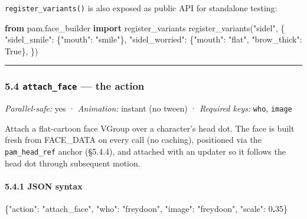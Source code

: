 \documentclass[
  12pt,
  letterpaper,
]{book}
\newenvironment{Shaded}{}{}
\newcommand{\DataTypeTok}[1]{\textcolor[rgb]{0.56,0.13,0.00}{#1}}
\newcommand{\DecValTok}[1]{\textcolor[rgb]{0.25,0.63,0.44}{#1}}
\newcommand{\ErrorTok}[1]{\textcolor[rgb]{1.00,0.00,0.00}{\textbf{#1}}}
\newcommand{\FunctionTok}[1]{\textcolor[rgb]{0.02,0.16,0.49}{#1}}
\newcommand{\ImportTok}[1]{\textcolor[rgb]{0.00,0.50,0.00}{\textbf{#1}}}
\newcommand{\NormalTok}[1]{#1}
\newcommand{\StringTok}[1]{\textcolor[rgb]{0.25,0.44,0.63}{#1}}
\newcommand{\VariableTok}[1]{\textcolor[rgb]{0.10,0.09,0.49}{#1}}
\begin{document}
\texttt{register\_variants()} is also exposed as public API for
standalone testing:

\begin{Shaded}
\begin{Highlighting}[]
\ImportTok{from}\NormalTok{ pam.face\_builder }\ImportTok{import}\NormalTok{ register\_variants}
\NormalTok{register\_variants(}\StringTok{"sidel"}\NormalTok{, \{}
    \StringTok{"sidel\_smile"}\NormalTok{:   \{}\StringTok{"mouth"}\NormalTok{: }\StringTok{"smile"}\NormalTok{\},}
    \StringTok{"sidel\_worried"}\NormalTok{: \{}\StringTok{"mouth"}\NormalTok{: }\StringTok{"flat"}\NormalTok{, }\StringTok{"brow\_thick"}\NormalTok{: }\VariableTok{True}\NormalTok{\},}
\NormalTok{\})}
\end{Highlighting}
\end{Shaded}

\begin{center}\rule{0.5\linewidth}{0.5pt}\end{center}

\subsubsection{\texorpdfstring{5.4 \texttt{attach\_face} --- the
action}{5.4 attach\_face --- the action}}\label{attach_face-the-action}

\emph{Parallel-safe:} yes · \emph{Animation:} instant (no tween) ·
\emph{Required keys:} \texttt{who}, \texttt{image}

Attach a flat-cartoon face VGroup over a character's head dot. The face
is built fresh from FACE\_DATA on every call (no caching), positioned
via the \texttt{pam\_head\_ref} anchor (§5.4.4), and attached with an
updater so it follows the head dot through subsequent motion.

\paragraph{5.4.1 JSON syntax}\label{json-syntax}

\begin{Shaded}
\begin{Highlighting}[]
\FunctionTok{\{}\DataTypeTok{"action"}\FunctionTok{:} \StringTok{"attach\_face"}\FunctionTok{,} \DataTypeTok{"who"}\FunctionTok{:} \StringTok{"freydoon"}\FunctionTok{,}
 \DataTypeTok{"image"}\FunctionTok{:} \StringTok{"freydoon"}\FunctionTok{,} \DataTypeTok{"scale"}\FunctionTok{:} \DecValTok{0}\ErrorTok{.}\DecValTok{35}\FunctionTok{\}}
\end{Highlighting}
\end{Shaded}
\end{document}
